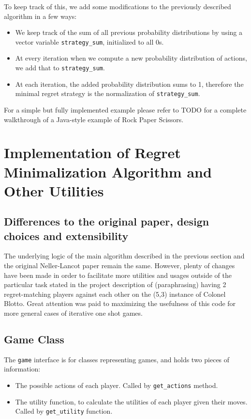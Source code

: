 \documentclass [11pt]{article}
\begin{document}
To keep track of this, we add some modifications to the previously described algorithm in a few ways:

\begin{itemize}
  \item We keep track of the sum of all previous probability distributions by using a vector variable \texttt{strategy\_sum}, initialized to all 0s.
  \item At every iteration when we compute a new probability distribution of actions, we add that to \texttt{strategy\_sum}.
  \item At each iteration, the added probability distribution sums to 1, therefore the minimal regret strategy is the normalization of \texttt{strategy\_sum}.
\end{itemize}


For a simple but fully implemented example please refer to TODO for a complete walkthrough of a Java-style example of Rock Paper Scissors.

\pagebreak

\section{Implementation of Regret Minimalization Algorithm and Other Utilities} \label{algorithm}

\subsection{Differences to the original paper, design choices and extensibility}

The underlying logic of the main algorithm described in the previous section and the original Neller-Lancot paper remain the same. However, plenty of changes have been made in order to facilitate more utilities and usages outside of the particular task stated in the project description of (paraphrasing) having 2 regret-matching players against each other on the (5,3) instance of Colonel Blotto. Great attention was paid to maximizing the usefulness of this code for more general cases of iterative one shot games.

\subsection{Game Class}

The \texttt{game} interface is for classes representing games, and holds two pieces of information:

\begin{itemize}
  \item The possible actions of each player. Called by \texttt{get\_actions} method.
  \item The utility function, to calculate the utilities of each player given their moves. Called by \texttt{get\_utility} function.
\end{itemize}
\end{document}
